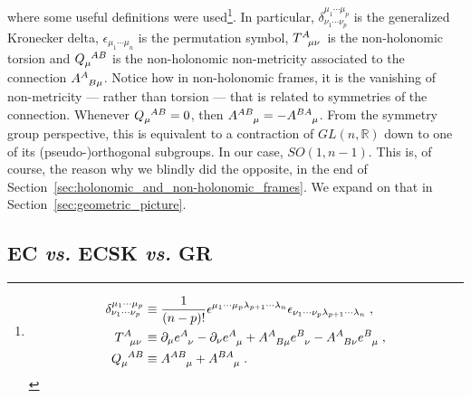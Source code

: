 \documentclass[../../main.tex]{subfiles}
\begin{document}
where some useful definitions were used\footnote{\setlength{\abovedisplayskip}{-6pt}
  \begin{align*}
    \delta^{\mu_1 \cdots \mu_p}_{\nu_1\cdots \nu_p} & \equiv \frac{1}{\left(n-p\right)!}\epsilon^{\mu_1 \cdots \mu_p \lambda_{p+1}\cdots\lambda_{n}}\epsilon_{\nu_1\cdots\nu_p\lambda_{p+1}\cdots\lambda_n}\;,     \\
    \tensor{T}{^A_{\mu\nu}}                         & \equiv \partial_\mu \tensor{e}{^A_\nu}- \partial_\nu \tensor{e}{^A_\mu} + \tensor{A}{^A_{B\mu}}\tensor{e}{^B_\nu}-\tensor{A}{^A_{B\nu}}\tensor{e}{^B_\mu}\;, \\
    \tensor{Q}{_\mu^{AB}}                           & \equiv \tensor{A}{^{AB}_\mu}+\tensor{A}{^{BA}_\mu} \;.
  \end{align*}}. In particular, $\delta^{\mu_1\cdots \mu_p}_{\nu_1\cdots\nu_p}$ is the generalized Kronecker delta, $\epsilon_{\mu_1\cdots \mu_n}$ is the permutation symbol, $\tensor{T}{^A_{\mu\nu}}$ is the non-holonomic torsion and $\tensor{Q}{_\mu^{AB}}$ is the non-holonomic non-metricity associated to the connection $\tensor{A}{^A_{B\mu}}$. Notice how in non-holonomic frames, it is the vanishing of non-metricity --- rather than torsion --- that is related to symmetries of the connection. Whenever $\tensor{Q}{_\mu^{AB}}=0$, then $\tensor{A}{^{AB}_\mu}=-\tensor{A}{^{BA}_\mu}$. From the symmetry group perspective, this is equivalent to a contraction of $GL(n,\mathbb{R})$ down to one of its (pseudo-)orthogonal subgroups. In our case, $SO\left(1,n-1\right)$. This is, of course, the reason why we blindly did the opposite, in the end of Section~\ref{sec:holonomic_and_non-holonomic_frames}. We expand on that in Section~\ref{sec:geometric_picture}.

\subsection{EC \textit{vs.} ECSK \textit{vs.} GR}\label{ssec:inequivalence}
\end{document}

